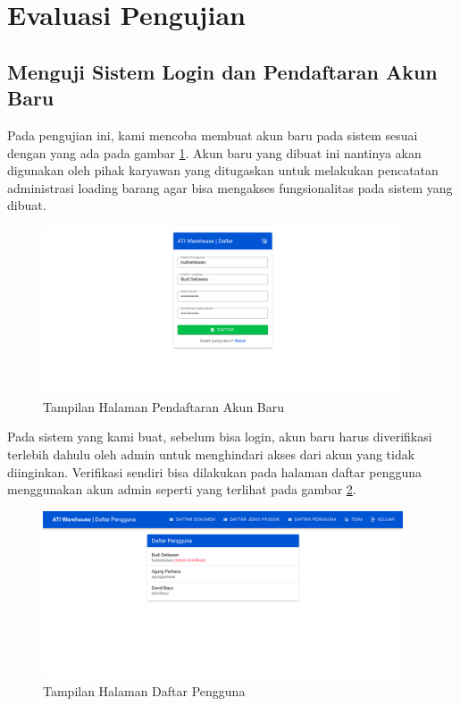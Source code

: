 \section{Evaluasi Pengujian}
\vspace{1ex}

\subsection{Menguji Sistem Login dan Pendaftaran Akun Baru}
\vspace{1ex}

Pada pengujian ini, kami mencoba membuat akun baru pada sistem sesuai dengan yang ada pada gambar \ref{fig:mendaftarAkun}.
Akun baru yang dibuat ini nantinya akan digunakan oleh pihak karyawan yang ditugaskan untuk melakukan pencatatan administrasi loading barang agar bisa mengakses fungsionalitas pada sistem yang dibuat.
\vspace{0.5ex}

\begin{figure} [ht!] \centering
  \includegraphics[width=0.95\textwidth]{gambar/mendaftar-akun.png}
  \caption{Tampilan Halaman Pendaftaran Akun Baru}
	\label{fig:mendaftarAkun}
\end{figure}

Pada sistem yang kami buat, sebelum bisa login, akun baru harus diverifikasi terlebih dahulu oleh admin untuk menghindari akses dari akun yang tidak diinginkan.
Verifikasi sendiri bisa dilakukan pada halaman daftar pengguna menggunakan akun admin seperti yang terlihat pada gambar \ref{fig:daftarPengguna}.
\vspace{0.5ex}

\begin{figure} [ht!] \centering
  \includegraphics[width=0.95\textwidth]{gambar/daftar-pengguna.png}
  \caption{Tampilan Halaman Daftar Pengguna}
	\label{fig:daftarPengguna}
\end{figure}

